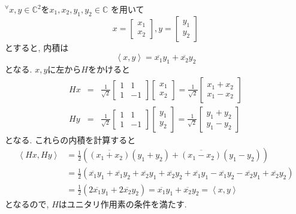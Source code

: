 \documentclass[a4paper,11pt]{jsarticle}
\begin{document}
${}^\forall x, y \in \mathbb{C}^2$を$x_1, x_2, y_1, y_2 \in \mathbb{C}$
を用いて
\[
  x = \begin{bmatrix}
    x_1 \\ x_2
  \end{bmatrix}, 
  y = \begin{bmatrix}
    y_1 \\ y_2
  \end{bmatrix}
\]
とすると, 内積は
\begin{equation*}
  \left<x, y\right> = \overline{x_1}y_1 + \overline{x_2}y_2
\end{equation*}
となる. $x, y$に左から$H$をかけると
\begin{eqnarray*}
  Hx &=& \frac{1}{\sqrt{2}} \begin{bmatrix}
    1 & 1 \\ 1 & -1
  \end{bmatrix} \begin{bmatrix}
    x_1 \\ x_2
  \end{bmatrix} = \frac{1}{\sqrt{2}} \begin{bmatrix}
    x_1 + x_2 \\ x_1 - x_2
  \end{bmatrix} \\
  Hy &=& \frac{1}{\sqrt{2}} \begin{bmatrix}
    1 & 1 \\ 1 & -1
  \end{bmatrix} \begin{bmatrix}
    y_1 \\ y_2
  \end{bmatrix} = \frac{1}{\sqrt{2}} \begin{bmatrix}
    y_1 + y_2 \\ y_1 - y_2
  \end{bmatrix}
\end{eqnarray*}
となる. これらの内積を計算すると
\begin{equation*}
  \begin{split}
    \left<Hx, Hy\right> &= \frac{1}{2}\left(
      \overline{\left(x_1+x_2\right)}\left(y_1+y_2\right) + 
      \overline{\left(x_1-x_2\right)}\left(y_1-y_2\right)
    \right) \\
    &= \frac{1}{2}\left(
      \overline{x_1}y_1+\overline{x_1}y_2
      +\overline{x_2}y_1+\overline{x_2}y_2
      +\overline{x_1}y_1-\overline{x_1}y_2
      -\overline{x_2}y_1+\overline{x_2}y_2
    \right) \\
    &= \frac{1}{2}\left(
      2\overline{x_1}y_1 + 2\overline{x_2}y_2
    \right) = \overline{x_1}y_1 + \overline{x_2}y_2
    = \left<x, y\right>
  \end{split}
\end{equation*}
となるので, $H$はユニタリ作用素の条件を満たす.
\end{document}
